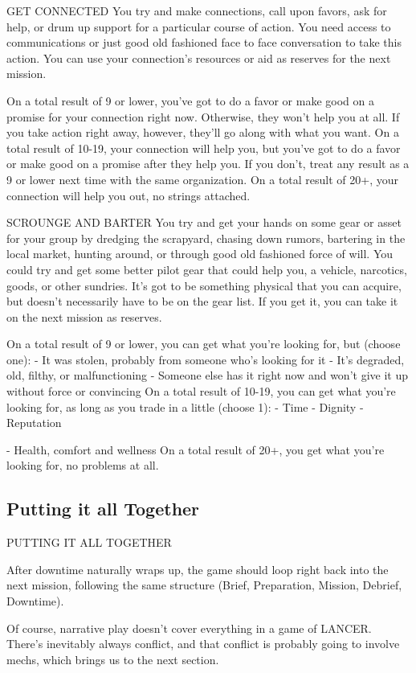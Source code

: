 GET CONNECTED  
You try and make connections, call upon favors, ask for help, or drum up support for a particular  
course of action. You need access to communications or just good old fashioned face to face  
conversation to take this action. You can use your connection’s resources or aid as reserves for  
the next mission.  

On a total result of 9 or lower, you’ve got to do a favor or make good on a promise for your  
connection right now. Otherwise, they won’t help you at all. If you take action right away, however,  
they’ll go along with what you want.  
On a total result of 10-19, your connection will help you, but you’ve got to do a favor or make good  
on a promise after they help you. If you don’t, treat any result as a 9 or lower next time with the  
same organization.  
On a total result of 20+, your connection will help you out, no strings attached.  

SCROUNGE AND BARTER  
You try and get your hands on some gear or asset for your group by dredging the scrapyard,  
chasing down rumors, bartering in the local market, hunting around, or through good old  
fashioned force of will. You could try and get some better pilot gear that could help you, a vehicle,  
narcotics, goods, or other sundries. It’s got to be something physical that you can acquire, but  
doesn’t necessarily have to be on the gear list. If you get it, you can take it on the next mission as  
reserves.  

On a total result of 9 or lower, you can get what you’re looking for, but (choose one):  
    -    It was stolen, probably from someone who’s looking for it  
    -    It’s degraded, old, filthy, or malfunctioning  
    -    Someone else has it right now and won’t give it up without force or convincing  
On a total result of 10-19, you can get what you’re looking for, as long as you trade in a little  
(choose 1):  
    -    Time  
    -    Dignity  
    -    Reputation  

                                                                                                                   


     -   Health, comfort and wellness  
On a total result of 20+, you get what you’re looking for, no problems at all.  

\subsection{Putting it all Together}
                                    PUTTING IT ALL TOGETHER  

After downtime naturally wraps up, the game should loop right back into the next mission,  
following the same structure (Brief, Preparation, Mission, Debrief, Downtime).  

Of course, narrative play doesn’t cover everything in a game of LANCER. There’s inevitably  
always conflict, and that conflict is probably going to involve mechs, which brings us to the next  
section.
 

                                                                  